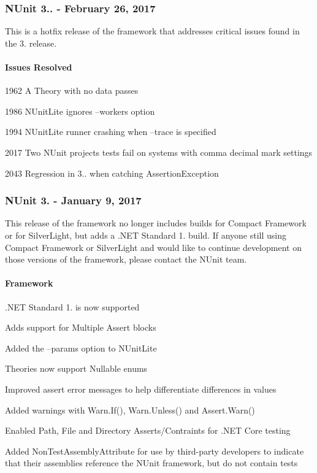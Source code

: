 \subsubsection*{N\+Unit 3.. -\/ February 26, 2017}

This is a hotfix release of the framework that addresses critical issues found in the 3. release.

\paragraph*{Issues Resolved}


\begin{DoxyItemize}
\item 1962 A Theory with no data passes
\item 1986 N\+Unit\+Lite ignores --workers option
\item 1994 N\+Unit\+Lite runner crashing when --trace is specified
\item 2017 Two N\+Unit project\textquotesingle{}s tests fail on systems with comma decimal mark settings
\item 2043 Regression in 3.. when catching Assertion\+Exception
\end{DoxyItemize}

\subsubsection*{N\+Unit 3. -\/ January 9, 2017}

This release of the framework no longer includes builds for Compact Framework or for Silver\+Light, but adds a .N\+ET Standard 1. build. If anyone still using Compact Framework or Silver\+Light and would like to continue development on those versions of the framework, please contact the N\+Unit team.

\paragraph*{Framework}


\begin{DoxyItemize}
\item .N\+ET Standard 1. is now supported
\item Adds support for Multiple Assert blocks
\item Added the --params option to N\+Unit\+Lite
\item Theories now support Nullable enums
\item Improved assert error messages to help differentiate differences in values
\item Added warnings with Warn.\+If(), Warn.\+Unless() and Assert.\+Warn()
\item Enabled Path, File and Directory Asserts/\+Contraints for .N\+ET Core testing
\item Added Non\+Test\+Assembly\+Attribute for use by third-\/party developers to indicate that their assemblies reference the N\+Unit framework, but do not contain tests
\end{DoxyItemize}

